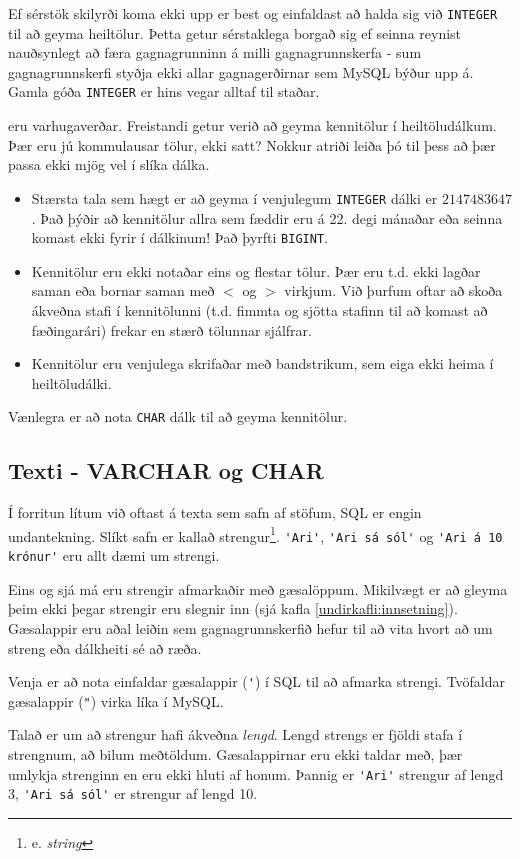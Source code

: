 Ef sérstök skilyrði koma ekki upp er best og einfaldast að halda sig við \verb|INTEGER| til að geyma heiltölur. Þetta getur sérstaklega borgað sig ef seinna reynist nauðsynlegt að færa gagnagrunninn á milli gagnagrunnskerfa - sum gagnagrunnskerfi styðja ekki allar gagnagerðirnar sem MySQL býður upp á. Gamla góða \verb|INTEGER| er hins vegar alltaf til staðar.

eru varhugaverðar. Freistandi getur verið að geyma kennitölur í heiltöludálkum. Þær eru jú kommulausar tölur, ekki satt? Nokkur atriði leiða þó til þess að þær passa ekki mjög vel í slíka dálka.

\begin{itemize}
 \item Stærsta tala sem hægt er að geyma í venjulegum \verb|INTEGER| dálki er $2147483647$. Það þýðir að kennitölur allra sem fæddir eru á 22. degi mánaðar eða seinna komast ekki fyrir í dálkinum! Það þyrfti \verb|BIGINT|.
 \item Kennitölur eru ekki notaðar eins og flestar tölur. Þær eru t.d. ekki lagðar saman eða bornar saman með $<$ og $>$ virkjum. Við þurfum oftar að skoða ákveðna stafi í kennitölunni (t.d. fimmta og sjötta stafinn til að komast að fæðingarári) frekar en stærð tölunnar sjálfrar.
 \item Kennitölur eru venjulega skrifaðar með bandstrikum, sem eiga ekki heima í heiltöludálki.
\end{itemize}
Vænlegra er að nota \verb|CHAR| dálk til að geyma kennitölur.

\subsection{Texti - VARCHAR og CHAR}
\label{undirkafli:texti}
Í forritun lítum við oftast á texta sem safn af stöfum, SQL er engin undantekning. Slíkt safn er kallað strengur\footnote{e. \emph{string}}. \verb|'Ari'|, \verb|'Ari sá sól'| og \verb|'Ari á 10 krónur'| eru allt dæmi um strengi. 

Eins og sjá má eru strengir afmarkaðir með gæsalöppum. Mikilvægt er að gleyma þeim ekki þegar strengir eru slegnir inn (sjá kafla \ref{undirkafli:innsetning}). Gæsalappir eru aðal leiðin sem gagnagrunnskerfið hefur til að vita hvort að um streng eða dálkheiti sé að ræða. 

Venja er að nota einfaldar gæsalappir (\verb|'|) í SQL til að afmarka strengi. Tvöfaldar gæsalappir (\verb|"|) virka líka í MySQL.

Talað er um að strengur hafi ákveðna \emph{lengd}. Lengd strengs er fjöldi stafa í strengnum, að bilum meðtöldum. Gæsalappirnar eru ekki taldar með, þær umlykja strenginn en eru ekki hluti af honum. Þannig er \verb|'Ari'| strengur af lengd 3, \verb|'Ari sá sól'| er strengur af lengd 10.

